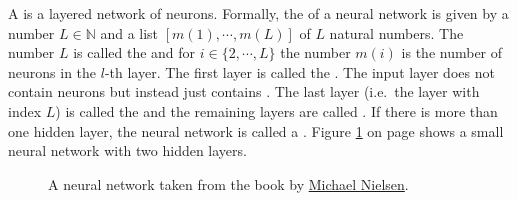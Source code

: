 A  is a layered network of neurons.  Formally, the  of a neural network is
given by a number $L \in \mathbb{N}$ and a list $[m(1), \cdots, m(L)]$ of $L$ natural numbers.  The number
$L$ is called the  and for $i \in \{2,\cdots,L\}$ the number $m(i)$ is the number of
neurons in the $l$-th layer.  The first layer is called the .  The input layer does not contain
neurons but instead just contains .  The last layer (i.e.~the
layer with index $L$) is called the  and the remaining layers are called 
.  If there is more than one hidden layer, the neural network is called a
.  Figure \ref{fig:neural-network.png} on page \pageref{fig:neural-network.png} shows
a small neural network with two hidden layers.

\begin{figure}[!h]
  \centering
   \caption{A neural network taken from the book by
     \href{http://neuralnetworksanddeeplearning.com}{Michael Nielsen}\cite{nielsen:2015}.}
  \label{fig:neural-network.png}
\end{figure}



